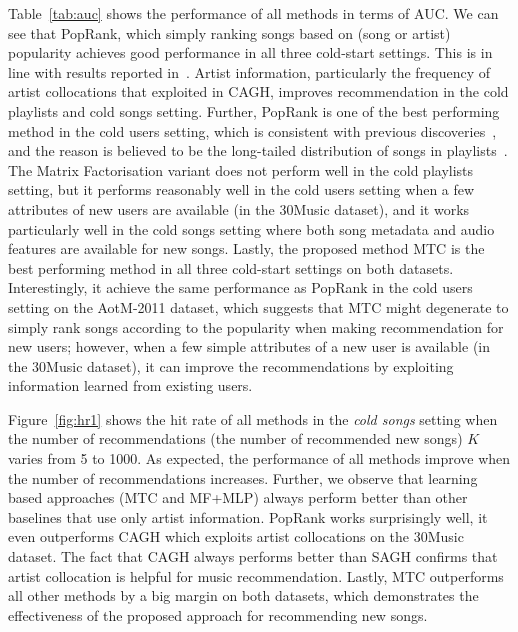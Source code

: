 Table~\ref{tab:auc} shows the performance of all methods in terms of AUC.
We can see that PopRank, which simply ranking songs based on (song or artist) popularity 
achieves good performance in all three cold-start settings.
This is in line with results reported in~\cite{bonnin2013evaluating,bonnin2015automated}.
Artist information, particularly the frequency of artist collocations that exploited in CAGH, 
improves recommendation in the cold playlists and cold songs setting.
Further, PopRank is one of the best performing method in the cold users setting,
which is consistent with previous discoveries~\cite{mcfee2012million,bonnin2013evaluating,bonnin2015automated},
and the reason is believed to be the long-tailed distribution of songs in
playlists~\cite{cremonesi2010performance,bonnin2013evaluating}.
The Matrix Factorisation variant does not perform well in the cold playlists setting,
but it performs reasonably well in the cold users setting when a few attributes of new users are available
(\eg in the 30Music dataset),
and it works particularly well in the cold songs setting where both song metadata and audio features are available 
for new songs.
Lastly, the proposed method MTC is the best performing method in all three cold-start settings on both datasets.
Interestingly, it achieve the same performance as PopRank in the cold users setting on the AotM-2011 dataset,
which suggests that MTC might degenerate to simply rank songs according to the popularity when making recommendation
for new users; however, when a few simple attributes of a new user is available (\eg in the 30Music dataset), 
it can improve the recommendations by exploiting information learned from existing users.


Figure~\ref{fig:hr1} shows the hit rate of all methods in the \emph{cold songs} setting
when the number of recommendations (\ie the number of recommended new songs) $K$ varies from 5 to 1000.
As expected, the performance of all methods improve when the number of recommendations increases.
Further, we observe that learning based approaches (\ie MTC and MF+MLP) always perform better than 
other baselines that use only artist information.
PopRank %
works surprisingly well, 
it even outperforms CAGH which exploits artist collocations on the 30Music dataset.
The fact that CAGH always performs better than SAGH confirms that artist collocation is helpful
for music recommendation.
Lastly, MTC outperforms all other methods by a big margin on both datasets,
which demonstrates the effectiveness of the proposed approach for recommending new songs.

